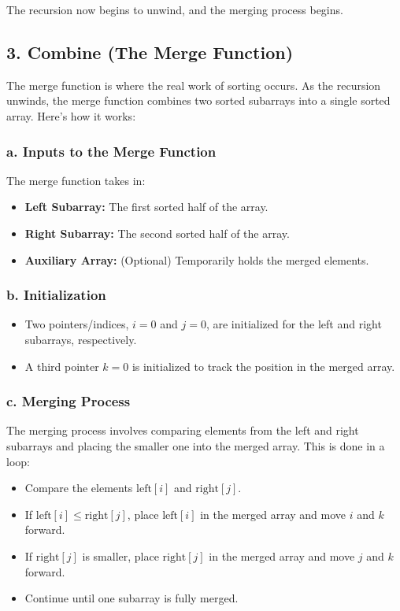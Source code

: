 \documentclass{article}
\begin{document}
The recursion now begins to unwind, and the merging process begins.

\subsection*{3. Combine (The Merge Function)}
The merge function is where the real work of sorting occurs. As the recursion unwinds, the merge function combines two sorted subarrays into a single sorted array. Here’s how it works:

\subsubsection*{a. Inputs to the Merge Function}
The merge function takes in:
\begin{itemize}
    \item \textbf{Left Subarray:} The first sorted half of the array.
    \item \textbf{Right Subarray:} The second sorted half of the array.
    \item \textbf{Auxiliary Array:} (Optional) Temporarily holds the merged elements.
\end{itemize}

\subsubsection*{b. Initialization}
\begin{itemize}
    \item Two pointers/indices, \(i = 0\) and \(j = 0\), are initialized for the left and right subarrays, respectively.
    \item A third pointer \(k = 0\) is initialized to track the position in the merged array.
\end{itemize}

\subsubsection*{c. Merging Process}
The merging process involves comparing elements from the left and right subarrays and placing the smaller one into the merged array. This is done in a loop:

\begin{itemize}
    \item Compare the elements \( \text{left}[i] \) and \( \text{right}[j] \).
    \item If \( \text{left}[i] \leq \text{right}[j] \), place \( \text{left}[i] \) in the merged array and move \(i\) and \(k\) forward.
    \item If \( \text{right}[j] \) is smaller, place \( \text{right}[j] \) in the merged array and move \(j\) and \(k\) forward.
    \item Continue until one subarray is fully merged.
\end{itemize}
\end{document}
